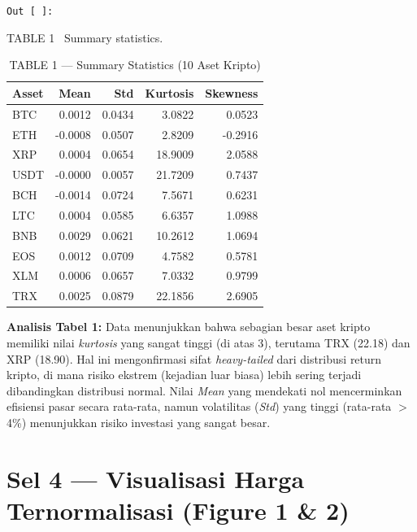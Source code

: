 \documentclass[12pt,a4paper]{article}
\newcommand{\cellOut}{%
  \vspace{-4pt}%
  \begin{tcolorbox}[cellheader, colback=outputbg, colframe=outputframe, fontupper=\sffamily\small\bfseries\color{outputframe!80!black}]
    \texttt{Out [ ]:}
  \end{tcolorbox}\vspace{-6pt}%
}
\begin{document}
\cellOut
\begin{tcolorbox}[outputbox]
TABLE 1 \textbar\ Summary statistics.
\end{tcolorbox}

\vspace{6pt}
\begin{table}[H]
  \centering
  \caption{TABLE 1 --- Summary Statistics (10 Aset Kripto)}
  \begin{tabular}{lrrrr}
    \toprule
    \textbf{Asset} & \textbf{Mean} & \textbf{Std} & \textbf{Kurtosis} & \textbf{Skewness} \\
    \midrule
    BTC  &  0.0012 & 0.0434 &  3.0822 &  0.0523 \\
    ETH  & -0.0008 & 0.0507 &  2.8209 & -0.2916 \\
    XRP  &  0.0004 & 0.0654 & 18.9009 &  2.0588 \\
    USDT & -0.0000 & 0.0057 & 21.7209 &  0.7437 \\
    BCH  & -0.0014 & 0.0724 &  7.5671 &  0.6231 \\
    LTC  &  0.0004 & 0.0585 &  6.6357 &  1.0988 \\
    BNB  &  0.0029 & 0.0621 & 10.2612 &  1.0694 \\
    EOS  &  0.0012 & 0.0709 &  4.7582 &  0.5781 \\
    XLM  &  0.0006 & 0.0657 &  7.0332 &  0.9799 \\
    TRX  &  0.0025 & 0.0879 & 22.1856 &  2.6905 \\
    \bottomrule
  \end{tabular}
\end{table}

\textbf{Analisis Tabel 1:} Data menunjukkan bahwa sebagian besar aset kripto memiliki nilai \textit{kurtosis} yang sangat tinggi (di atas 3), terutama TRX (22.18) dan XRP (18.90). Hal ini mengonfirmasi sifat \textit{heavy-tailed} dari distribusi return kripto, di mana risiko ekstrem (kejadian luar biasa) lebih sering terjadi dibandingkan distribusi normal. Nilai \textit{Mean} yang mendekati nol mencerminkan efisiensi pasar secara rata-rata, namun volatilitas (\textit{Std}) yang tinggi (rata-rata $>$ 4\%) menunjukkan risiko investasi yang sangat besar.

\section{Sel 4 --- Visualisasi Harga Ternormalisasi (Figure 1 \& 2)}
\end{document}
